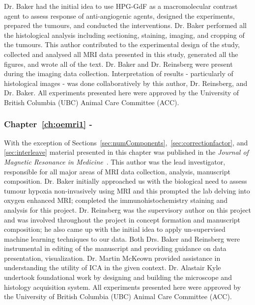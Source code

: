 Dr. Baker had the initial idea to use \acs{HPG-GdF} as a macromolecular contrast agent to assess response of anti-angiogenic agents, designed the experiments, prepared the tumours, and conducted the interventions.
Dr. Baker performed all the histological analysis including sectioning, staining, imaging, and cropping of the tumours.
This author contributed to the experimental design of the study, collected and analysed all MRI data presented in this study, generated all the figures, and wrote all of the text. 
Dr. Baker and Dr. Reinsberg were present during the imaging data collection.
Interpretation of results - particularly of histological images - was done collaboratively by this author, Dr. Reinsberg, and Dr. Baker.
All experiments presented here were approved by the University of British Columbia (UBC) Animal Care Committee (ACC).

\subsubsection{Chapter~\ref{ch:oemri1} - }

With the exception of Sections~\ref{sec:numComponents},~\ref{sec:correctionfactor}, and \ref{sec:interleave} material presented in this chapter was published in the \textit{Journal of Magnetic Resonance in Medicine}~\cite{Moosvi:2018ca}. 
This author was the lead investigator, responsible for all major areas of MRI data collection, analysis, manuscript composition. 
Dr. Baker initially approached us with the biological need to assess tumour hypoxia non-invasively using MRI and this prompted the lab delving into oxygen enhanced MRI; completed the immunohistochemistry staining and analysis for this project.
Dr. Reinsberg was the supervisory author on this project and was involved throughout the project in concept formation and manuscript composition; he also came up with the initial idea to apply un-supervised machine learning techniques to our data. 
Both Drs. Baker and Reinsberg were instrumental in editing of the manuscript and providing guidance on data presentation, visualization.
Dr. Martin McKeown provided assistance in understanding the utility of \ac{ICA} in the given context. 
Dr. Alastair Kyle undertook foundational work by designing and building the microscope and histology acquisition system. 
All experiments presented here were approved by the University of British Columbia (UBC) Animal Care Committee (ACC).

